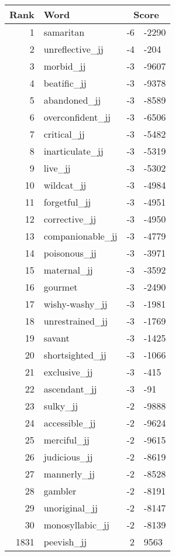 \begin{longtable}[!htbp]{| rlr@{.}l |}
    \hline
    \textbf{Rank} & \textbf{Word} & \multicolumn{2}{c|}{\textbf{Score}} \\
    \hline
    \endhead
    1 & samaritan & -6 & -2290 \\
    2 & unreflective\_jj & -4 & -204 \\
    3 & morbid\_jj & -3 & -9607 \\
    4 & beatific\_jj & -3 & -9378 \\
    5 & abandoned\_jj & -3 & -8589 \\
    6 & overconfident\_jj & -3 & -6506 \\
    7 & critical\_jj & -3 & -5482 \\
    8 & inarticulate\_jj & -3 & -5319 \\
    9 & live\_jj & -3 & -5302 \\
    10 & wildcat\_jj & -3 & -4984 \\
    11 & forgetful\_jj & -3 & -4951 \\
    12 & corrective\_jj & -3 & -4950 \\
    13 & companionable\_jj & -3 & -4779 \\
    14 & poisonous\_jj & -3 & -3971 \\
    15 & maternal\_jj & -3 & -3592 \\
    16 & gourmet & -3 & -2490 \\
    17 & wishy-washy\_jj & -3 & -1981 \\
    18 & unrestrained\_jj & -3 & -1769 \\
    19 & savant & -3 & -1425 \\
    20 & shortsighted\_jj & -3 & -1066 \\
    21 & exclusive\_jj & -3 & -415 \\
    22 & ascendant\_jj & -3 & -91 \\
    23 & sulky\_jj & -2 & -9888 \\
    24 & accessible\_jj & -2 & -9624 \\
    25 & merciful\_jj & -2 & -9615 \\
    26 & judicious\_jj & -2 & -8619 \\
    27 & mannerly\_jj & -2 & -8528 \\
    28 & gambler & -2 & -8191 \\
    29 & unoriginal\_jj & -2 & -8147 \\
    30 & monosyllabic\_jj & -2 & -8139 \\
    1831 & peevish\_jj & 2 & 9563 \\

\end{longtable}
